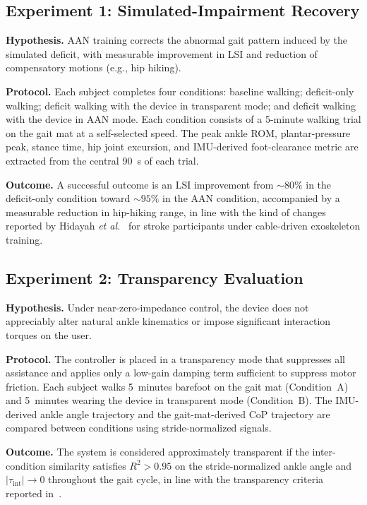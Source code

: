 \documentclass[conference]{IEEEtran}
\begin{document}
\subsection{Experiment 1: Simulated-Impairment Recovery}

\textbf{Hypothesis.} AAN training corrects the abnormal gait pattern induced by the simulated deficit, with measurable improvement in LSI and reduction of compensatory motions (e.g., hip hiking).

\textbf{Protocol.} Each subject completes four conditions: baseline walking; deficit-only walking; deficit walking with the device in transparent mode; and deficit walking with the device in AAN mode. Each condition consists of a 5-minute walking trial on the gait mat at a self-selected speed. The peak ankle ROM, plantar-pressure peak, stance time, hip joint excursion, and IMU-derived foot-clearance metric are extracted from the central 90~s of each trial.

\textbf{Outcome.} A successful outcome is an LSI improvement from $\sim 80\%$ in the deficit-only condition toward $\sim 95\%$ in the AAN condition, accompanied by a measurable reduction in hip-hiking range, in line with the kind of changes reported by Hidayah \emph{et al.}~\cite{hidayah2020calex} for stroke participants under cable-driven exoskeleton training.

\subsection{Experiment 2: Transparency Evaluation}

\textbf{Hypothesis.} Under near-zero-impedance control, the device does not appreciably alter natural ankle kinematics or impose significant interaction torques on the user.

\textbf{Protocol.} The controller is placed in a transparency mode that suppresses all assistance and applies only a low-gain damping term sufficient to suppress motor friction. Each subject walks 5~minutes barefoot on the gait mat (Condition~A) and 5~minutes wearing the device in transparent mode (Condition~B). The IMU-derived ankle angle trajectory and the gait-mat-derived CoP trajectory are compared between conditions using stride-normalized signals.

\textbf{Outcome.} The system is considered approximately transparent if the inter-condition similarity satisfies $R^2 > 0.95$ on the stride-normalized ankle angle and $|\tau_{\mathrm{int}}| \to 0$ throughout the gait cycle, in line with the transparency criteria reported in~\cite{galle2013adaptation,jackson2019heuristic}.
\end{document}
